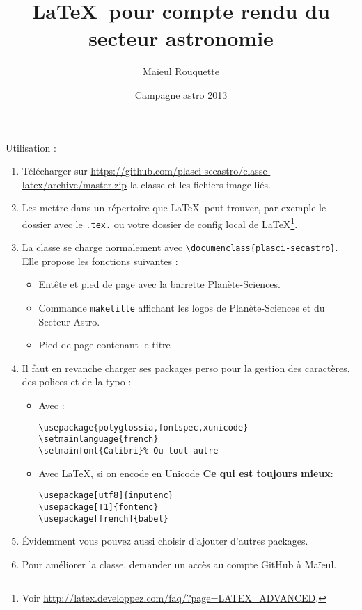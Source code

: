 \documentclass{plasci-secastro}
\date{Campagne astro 2013}
\author{Maïeul Rouquette}
\title{\LaTeX\ pour compte rendu du secteur astronomie}
\begin{document}
\maketitle

Utilisation :
\begin{enumerate}
	\item Télécharger sur \url{https://github.com/plasci-secastro/classe-latex/archive/master.zip} la classe et les fichiers image liés.
	\item Les mettre dans un répertoire que \LaTeX\ peut trouver, par exemple le dossier avec le \verb+.tex.+ ou votre dossier de config local de \LaTeX\footnote{Voir \url{http://latex.developpez.com/faq/?page=LATEX_ADVANCED}.}.
	\item La classe se charge normalement avec \verb+\documenclass{plasci-secastro}+. Elle propose les fonctions suivantes :
		\begin{itemize}
			\item Entête et pied de page avec la barrette Planète-Sciences.
			\item Commande \verb+maketitle+ affichant les logos de Planète-Sciences et du Secteur Astro.
			\item Pied de page contenant le titre
		\end{itemize}
	\item Il faut en revanche charger ses packages perso pour la gestion des caractères, des polices et de la typo :
		\begin{itemize}
			\item Avec \XeLaTeX:
				\begin{verbatim}
\usepackage{polyglossia,fontspec,xunicode}
\setmainlanguage{french}
\setmainfont{Calibri}% Ou tout autre
				\end{verbatim}
			\item Avec \LaTeX, si on encode en Unicode \textbf{Ce qui est toujours mieux}:
				\begin{verbatim}
\usepackage[utf8]{inputenc}  
\usepackage[T1]{fontenc}
\usepackage[french]{babel}  
				\end{verbatim}
		\end{itemize}
	\item Évidemment vous pouvez aussi choisir d'ajouter d'autres packages.
	\item Pour améliorer la classe, demander un accès au compte GitHub à Maïeul.
\end{enumerate}
\end{document}
